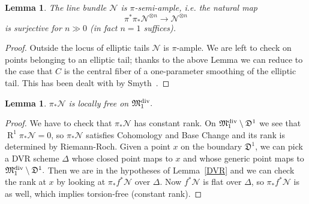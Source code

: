 \documentclass[11pt]{amsart}
\renewcommand{\to}{\rightarrow}
\newcommand{\MM}{\mathfrak M}
\newcommand{\R}{\operatorname{R}}
\newcommand{\dvr}{\Delta}
\theoremstyle{plain}
\newtheorem{lem}[thm]{Lemma}
\theoremstyle{definition}
\begin{document}
\begin{lem}\label{lemma:semiample}
The line bundle $\mathcal N$ is $\pi$-semi-ample, i.e. the natural map
\[\pi^*\pi_*\mathcal N^{\otimes n}\to \mathcal N^{\otimes n}\]
is surjective for $n\gg 0$ (in fact $n=1$ suffices).
\end{lem}
\begin{proof}
Outside the locus of elliptic tails $\mathcal N$ is $\pi$-ample. We are left to check on points belonging to an elliptic tail; thanks to the above Lemma we can reduce to the case that $C$ is the central fiber of a one-parameter smoothing of the elliptic tail. This has been dealt with by Smyth~\cite[Lemma~2.12]{SMY1}.
\end{proof}

\begin{lem}
$\pi_*\mathcal N$ is locally free on $\MM_1^{\rm{div}}.$
\end{lem}
\begin{proof}\cite[Proposition~3.7.2.1]{RSPW}
We have to check that $\pi_*\mathcal N$ has constant rank.
On $\MM_1^{\rm{div}}\setminus \mathfrak{D}^1$ we see that $\R^1\pi_*\mathcal N=0$, so $\pi_*\mathcal N$ satisfies Cohomology and Base Change and its rank is determined by Riemann-Roch.
Given a point $x$ on the boundary $\mathfrak{D}^1$, we can pick a DVR scheme $\dvr$ whose closed point maps to $x$ and whose generic point maps to $\MM_1^{\rm{div}}\setminus \mathfrak{D}^1.$ Then we are in the hypotheses of Lemma~\ref{DVR} and we can check the rank at $x$ by looking at $\pi_*f^*\mathcal N$ over $\dvr.$ Now $f^*\mathcal N$ is flat over $\dvr$, so $\pi_*f^*\mathcal N$ is as well, which implies torsion-free (constant rank).
\end{proof}
\end{document}
